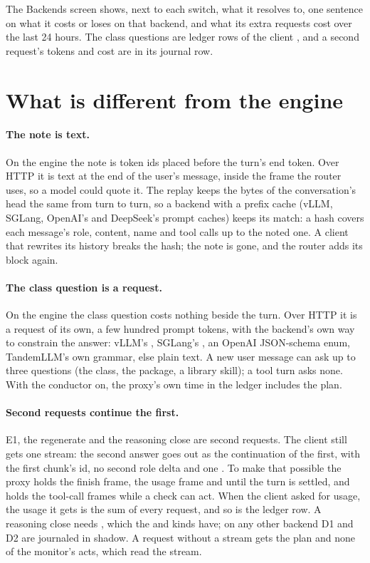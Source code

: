 The Backends screen shows, next to each switch, what it resolves to, one sentence on what it costs or loses on that backend, and what its extra requests cost over the last 24 hours. The class questions are ledger rows of the client , and a second request's tokens and cost are in its journal row.

\section{What is different from the engine}

\paragraph{The note is text.} On the engine the note is token ids placed before the turn's end token. Over HTTP it is text at the end of the user's message, inside the  frame the router uses, so a model could quote it. The replay keeps the bytes of the conversation's head the same from turn to turn, so a backend with a prefix cache (vLLM, SGLang, OpenAI's and DeepSeek's prompt caches) keeps its match: a hash covers each message's role, content, name and tool calls up to the noted one. A client that rewrites its history breaks the hash; the note is gone, and the router adds its block again.

\paragraph{The class question is a request.} On the engine the class question costs nothing beside the turn. Over HTTP it is a request of its own, a few hundred prompt tokens, with the backend's own way to constrain the answer: vLLM's , SGLang's , an OpenAI JSON-schema enum, TandemLLM's own grammar, else plain text. A new user message can ask up to three questions (the class, the package, a library skill); a tool turn asks none. With the conductor on, the proxy's own time in the ledger includes the plan.

\paragraph{Second requests continue the first.} E1, the regenerate and the reasoning close are second requests. The client still gets one stream: the second answer goes out as the continuation of the first, with the first chunk's id, no second role delta and one \code{[DONE]}. To make that possible the proxy holds the finish frame, the usage frame and \code{[DONE]} until the turn is settled, and holds the tool-call frames while a check can act. When the client asked for usage, the usage it gets is the sum of every request, and so is the ledger row. A reasoning close needs , which the  and  kinds have; on any other backend D1 and D2 are journaled in shadow. A request without a stream gets the plan and none of the monitor's acts, which read the stream.

